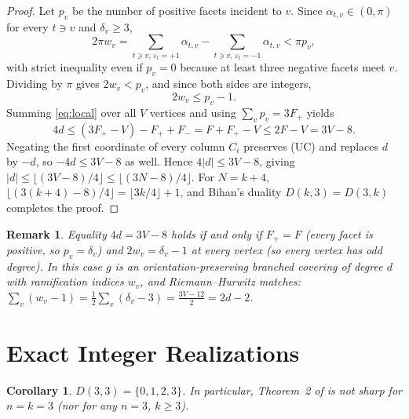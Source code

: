 \documentclass[11pt]{article}
\newtheorem{corollary}[theorem]{Corollary}
\newtheorem{remark}[theorem]{Remark}
\begin{document}
\begin{proof}
Let $p_v$ be the number of positive facets incident to $v$. Since $\alpha_{t,v}\in(0,\pi)$ for every $t\ni v$ and $\delta_v\ge 3$,
\[
2\pi w_v = \sum_{t\ni v,\,\varepsilon_t=+1}\alpha_{t,v} - \sum_{t\ni v,\,\varepsilon_t=-1}\alpha_{t,v} < \pi p_v,
\]
with strict inequality even if $p_v=0$ because at least three negative facets meet $v$. Dividing by $\pi$ gives $2w_v < p_v$, and since both sides are integers,
\begin{equation}\label{eq:local}
2w_v \le p_v - 1.
\end{equation}
Summing \eqref{eq:local} over all $V$ vertices and using $\sum_v p_v = 3F_+$ yields
\[
4d \le (3F_+ - V) - F_+ + F_- = F + F_+ - V \le 2F - V = 3V - 8.
\]
Negating the first coordinate of every column $C_i$ preserves \textup{(UC)} and replaces $d$ by $-d$, so $-4d \le 3V-8$ as well. Hence $4|d|\le 3V-8$, giving $|d|\le \lfloor(3V-8)/4\rfloor \le \lfloor(3N-8)/4\rfloor$. For $N=k+4$, $\lfloor(3(k+4)-8)/4\rfloor=\lfloor 3k/4\rfloor+1$, and Bihan's duality $D(k,3)=D(3,k)$ completes the proof.
\end{proof}

\begin{remark}
Equality $4d=3V-8$ holds if and only if $F_+=F$ (every facet is positive, so $p_v=\delta_v$) and $2w_v=\delta_v-1$ at every vertex (so every vertex has odd degree). In this case $g$ is an orientation-preserving branched covering of degree $d$ with ramification indices $w_v$, and Riemann--Hurwitz matches: $\sum_v(w_v-1)=\frac{1}{2}\sum_v(\delta_v-3)=\frac{3V-12}{2}=2d-2$.
\end{remark}

\section{Exact Integer Realizations}

\begin{corollary}
$D(3,3) = \{0,1,2,3\}$. In particular, Theorem~2 of \cite{Bihan2026} is not sharp for $n=k=3$ (nor for any $n=3$, $k\ge 3$).
\end{corollary}
\end{document}
